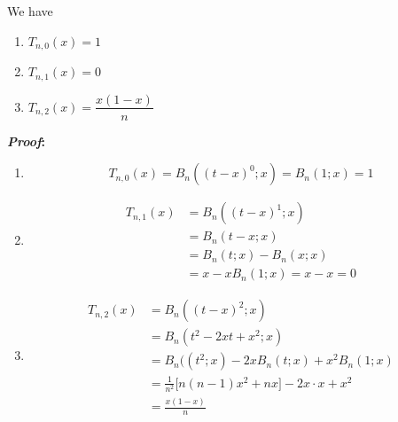 \begin{theorem}
	We have
	\begin{enumerate}
		\item \(T_{n,0}(x)=1\)
		\item \(T_{n,1}(x)=0\)
		\item \(T_{n,2}(x)=\dfrac{x(1-x)}{n}\)
	\end{enumerate}
\end{theorem}
\noindent
\textbf{\textit{Proof}:}
\begin{enumerate}
	\item 
    \[
	T_{n,0}(x)  = B_n((t-x)^0;x) = B_n(1;x) = 1
	\]
	\item 
	\begin{align*}
		T_{n,1}(x) &= B_n((t-x)^1;x)\\
		&= B_n(t-x;x)\\
		&= B_n(t;x) - B_n(x;x)\\
		&= x - x B_n(1;x) = x - x = 0
	\end{align*}
	\item 
	\begin{align*}
		T_{n,2}(x) &= B_n((t-x)^2;x)\\
		&= B_n(t^2-2xt+x^2;x)\\
		&= B_n((t^2;x) - 2x B_n(t;x) + x^2B_n(1;x)\\
		&= \frac{1}{n^2}\Big[n(n-1)x^2+nx\Big] - 2x\cdot x + x^2\\
		&= \frac{x(1-x)}{n}
	\end{align*}
\end{enumerate}
